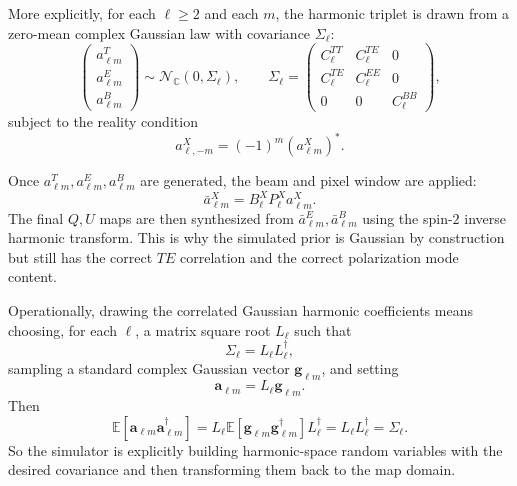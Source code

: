 \documentclass[11pt]{article}
\newcommand{\EE}{\mathbb{E}}
\begin{document}
More explicitly, for each \(\ell\ge 2\) and each \(m\), the harmonic triplet is drawn from a zero-mean complex Gaussian law with covariance \(\Sigma_\ell\):
\begin{equation}
  \begin{pmatrix}
    a_{\ell m}^T\\ a_{\ell m}^E\\ a_{\ell m}^B
  \end{pmatrix}
  \sim \mathcal{N}_{\mathbb{C}}(0,\Sigma_\ell),
  \qquad
  \Sigma_\ell
  =
  \begin{pmatrix}
    C_\ell^{TT} & C_\ell^{TE} & 0\\
    C_\ell^{TE} & C_\ell^{EE} & 0\\
    0 & 0 & C_\ell^{BB}
  \end{pmatrix},
\end{equation}
subject to the reality condition
\begin{equation}
  a_{\ell,-m}^X = (-1)^m (a_{\ell m}^X)^\ast.
\end{equation}

Once \(a_{\ell m}^T,a_{\ell m}^E,a_{\ell m}^B\) are generated, the beam and pixel window are applied:
\begin{equation}
  \bar a_{\ell m}^X = B_\ell^X P_\ell^X a_{\ell m}^X.
\end{equation}
The final \(Q,U\) maps are then synthesized from \(\bar a_{\ell m}^E,\bar a_{\ell m}^B\) using the spin-\(2\) inverse harmonic transform. This is why the simulated prior is Gaussian by construction but still has the correct \(TE\) correlation and the correct polarization mode content.

Operationally, drawing the correlated Gaussian harmonic coefficients means choosing, for each \(\ell\), a matrix square root \(L_\ell\) such that
\begin{equation}
  \Sigma_\ell = L_\ell L_\ell^\dagger,
\end{equation}
sampling a standard complex Gaussian vector \(\mathbf g_{\ell m}\), and setting
\begin{equation}
  \mathbf a_{\ell m} = L_\ell \mathbf g_{\ell m}.
\end{equation}
Then
\begin{equation}
  \EE[\mathbf a_{\ell m}\mathbf a_{\ell m}^\dagger]
  =
  L_\ell \EE[\mathbf g_{\ell m}\mathbf g_{\ell m}^\dagger]L_\ell^\dagger
  =
  L_\ell L_\ell^\dagger
  =
  \Sigma_\ell.
\end{equation}
So the simulator is explicitly building harmonic-space random variables with the desired covariance and then transforming them back to the map domain.
\end{document}
